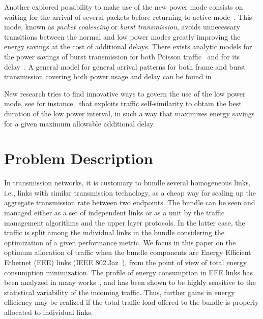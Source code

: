 \documentclass[journal,english,twocolumn,10pt,letterpaper]{IEEEtran}
\begin{document}
{  Another explored possibility to make use of the new power mode consists on
  waiting for the arrival of several packets before returning to active
  mode~\cite{reviriego10:_burst_tx_eee,aksic14:_packet_ether}. This mode,
  known as \emph{packet coalescing} or \emph{burst transmission}, avoids
  unnecessary transitions between the normal and low power modes greatly
  improving the energy savings at the cost of additional delays. There exists
  analytic models for the power savings of burst transmission for both Poisson
  traffic~\cite{herreria11:_power_savin_model_burst_trans} and for its
  delay~\cite{Bolla201416,herreria12:_optim_energ_effic_ether}. A general
  model for general arrival patterns for both frame and burst transmission
  covering both power usage and delay can be found
  in~\cite{herreria12:_gi_g_model_gb_energ_effic_ether}.
 
  New research tries to find innovative ways to govern the use of the low
  power mode, see for instance~\cite{cenedese14:_ether} that exploits traffic
  self-similarity to obtain the best duration of the low power interval, in
  such a way that maximizes energy savings for a given maximum allowable
  additional delay.

  
}

\section{Problem Description}
\label{sec:problem-description}

In transmission networks, it is customary to bundle several homogeneous links,
i.e., links with similar transmission technology, as a cheap way for scaling
up the aggregate transmission rate between two endpoints. The bundle can be
seen and managed either as a set of independent links or as a unit by the
traffic management algorithms and the upper layer protocols. In the latter
case, the traffic is split among the individual links in the bundle
considering the optimization of a given performance metric. We focus in this
paper on the optimum allocation of traffic when the bundle components are
Energy Efficient Ethernet (EEE) links (IEEE 802.3az~\cite{802.3az}), from the
point of view of total energy consumption minimization. The profile of energy
consumption in EEE links has been analyzed in many
works~\cite{reviriego09:_perf_eval_eee,reviriego11:_initial_evaluat_energ_effic_ether,herreria11:_oppor_ether,herreria11:_power_savin_model_burst_trans,marsan11:_simpl_analy_model_energ_effic_ether,herreria12:_gi_g_model_gb_energ_effic_ether,Vitturi2015228,Bolla201416},
and has been shown to be highly sensitive to the statistical variability of
the incoming traffic. Thus, further gains in energy efficiency may be realized
if the total traffic load offered to the bundle is properly allocated to
individual links.
\end{document}
